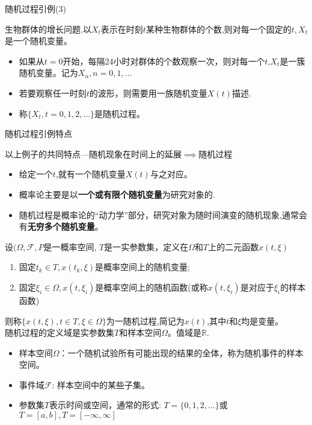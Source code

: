 \begin{frame}{随机过程引例(3)}
\begin{example}
	生物群体的增长问题.以$X_t$表示在时刻$t$某种生物群体的个数,则对每一个固定的$t,X_t$是一个随机变量。　
	\begin{itemize}
		\item 如果从$t=0$开始，每隔24小时对群体的个数观察一次，则对每一个$t$,$X_t$是一簇随机变量。记为$X_n,n=0,1,\dots$
		\item 若要观察任一时刻$t$的波形，则需要用一族随机变量$X(t)$描述. 
		\item 称$\{X_t,t=0,1,2,\dots\}$是随机过程。
	\end{itemize}	
\end{example}
\end{frame}

\begin{frame}{随机过程引例特点}
\begin{block}{以上例子的共同特点---随机现象在时间上的延展$\implies$随机过程}
	\begin{itemize}
		\item 给定一个$t$,就有一个随机变量$X(t)$与之对应。
		\item 概率论主要是以\textbf{一个或有限个随机变量}为研究对象的.
		\item 随机过程是概率论的``动力学''部分，研究对象为随时间演变的随机现象,通常会有\textbf{无穷多个随机变量}。
	\end{itemize}	
\end{block}
\end{frame}

\begin{frame}%
\begin{definition}[随机过程]
	设$(\Omega,\mathcal{F},P$是一概率空间, $T$是一实参数集，定义在$\Omega$和$T$上的二元函数$x(t,\xi)$
	\begin{enumerate}
		\item 固定$t_k\in T,x(t_k,\xi)$是概率空间上的随机变量;
		\item 固定$\xi_i\in\Omega,x(t,\xi_i)$是概率空间上的随机函数(或称$x(t,\xi_i)$是对应于$\xi_i$的样本函数)
	\end{enumerate}
    则称$\{x(t,\xi),t\in T,\xi\in \Omega \}$为一随机过程,简记为$x(t)$,其中$t$和$\xi$均是变量。\\
	随机过程的定义域是实参数集$T$和样本空间$\Omega$。值域是$\mathbb{R}$.
	\begin{itemize}
		\item 样本空间$\Omega$：一个随机试验所有可能出现的结果的全体，称为随机事件的样本空间。\\
		\item 事件域$\mathcal{F}$: 样本空间中的某些子集。
		\item
		参数集$T$表示时间或空间，通常的形式: $T=\{0,1,2,\dots \}$或$T=[a,b],T=[-\infty,\infty]$
	\end{itemize}
	\end{definition}
\end{frame}

